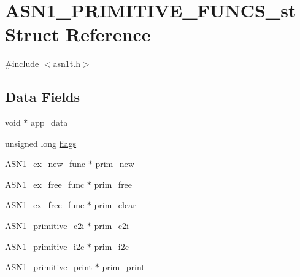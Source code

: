 \hypertarget{struct_a_s_n1___p_r_i_m_i_t_i_v_e___f_u_n_c_s__st}{}\section{A\+S\+N1\+\_\+\+P\+R\+I\+M\+I\+T\+I\+V\+E\+\_\+\+F\+U\+N\+C\+S\+\_\+st Struct Reference}
\label{struct_a_s_n1___p_r_i_m_i_t_i_v_e___f_u_n_c_s__st}


{\ttfamily \#include $<$asn1t.\+h$>$}

\subsection*{Data Fields}
\begin{DoxyCompactItemize}
\item 
\hyperlink{hw__4758__cca_8h_afad4d591c7931ff6dc5bf69c76c96aa0}{void} $\ast$ \hyperlink{struct_a_s_n1___p_r_i_m_i_t_i_v_e___f_u_n_c_s__st_a2d755a5df39e3da5ae2a0630fbe24c41}{app\+\_\+data}
\item 
unsigned long \hyperlink{struct_a_s_n1___p_r_i_m_i_t_i_v_e___f_u_n_c_s__st_a9e339c2784bd040b26a5112866700bff}{flags}
\item 
\hyperlink{include_2openssl_2asn1t_8h_a974a90edb24a690e5e664128a975412e}{A\+S\+N1\+\_\+ex\+\_\+new\+\_\+func} $\ast$ \hyperlink{struct_a_s_n1___p_r_i_m_i_t_i_v_e___f_u_n_c_s__st_aff8b2de96c683897438e055d505f780f}{prim\+\_\+new}
\item 
\hyperlink{include_2openssl_2asn1t_8h_a98b861bda8c86873a9d02978fcba10cf}{A\+S\+N1\+\_\+ex\+\_\+free\+\_\+func} $\ast$ \hyperlink{struct_a_s_n1___p_r_i_m_i_t_i_v_e___f_u_n_c_s__st_a28b5467a8187b2a2b06d1e2b9812e8e7}{prim\+\_\+free}
\item 
\hyperlink{include_2openssl_2asn1t_8h_a98b861bda8c86873a9d02978fcba10cf}{A\+S\+N1\+\_\+ex\+\_\+free\+\_\+func} $\ast$ \hyperlink{struct_a_s_n1___p_r_i_m_i_t_i_v_e___f_u_n_c_s__st_a5b509f1e89924d0953629d049cbc56e5}{prim\+\_\+clear}
\item 
\hyperlink{include_2openssl_2asn1t_8h_ab34a4f1715f45ed81e472fd414514dde}{A\+S\+N1\+\_\+primitive\+\_\+c2i} $\ast$ \hyperlink{struct_a_s_n1___p_r_i_m_i_t_i_v_e___f_u_n_c_s__st_a73fb772fd3d8f5fa636a7e25f0ea9729}{prim\+\_\+c2i}
\item 
\hyperlink{include_2openssl_2asn1t_8h_a72e2873d17f193fa4ea3065ec836faeb}{A\+S\+N1\+\_\+primitive\+\_\+i2c} $\ast$ \hyperlink{struct_a_s_n1___p_r_i_m_i_t_i_v_e___f_u_n_c_s__st_a26aec35fb58eb2be36be66175cdf6201}{prim\+\_\+i2c}
\item 
\hyperlink{include_2openssl_2asn1t_8h_ab187aa961b579cd7c27152c51a3e21b3}{A\+S\+N1\+\_\+primitive\+\_\+print} $\ast$ \hyperlink{struct_a_s_n1___p_r_i_m_i_t_i_v_e___f_u_n_c_s__st_ac0f755b191c802a8f7742ea76f15d96b}{prim\+\_\+print}
\end{DoxyCompactItemize}



